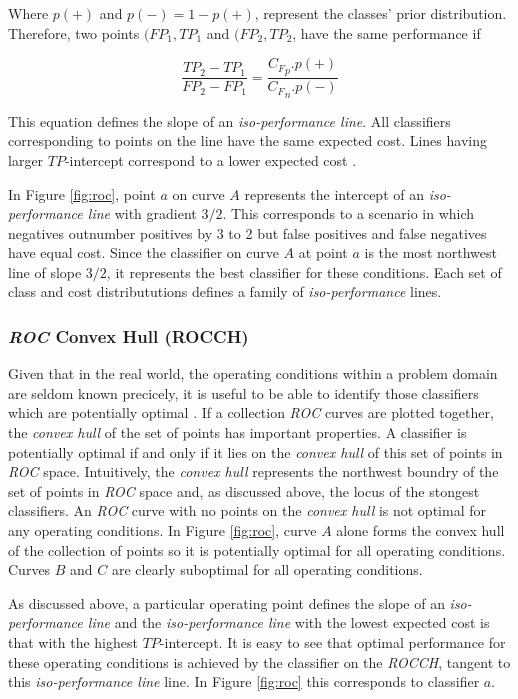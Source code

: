 \documentclass[10pt]{unbthesis}
\begin{document}
Where \(p(+)\) and \(p(-) = 1 - p(+)\), represent the classes' prior
distribution. Therefore, two points \((FP_1, TP_1\) and \((FP_2,
TP_2\), have the same performance if 

\begin{equation}
  \frac{TP_2 - TP_1}{FP_2 - FP_1} = \frac{{C_F}_p . p(+)}{{C_F}_n . p(-)}
\end{equation}

This equation defines the slope of an \textit{iso-performance
  line}. All classifiers corresponding to points on the line have the
same expected cost. Lines having larger \(TP\)-intercept correspond to
a lower expected cost \cite{RefWorks:61}.

In Figure \ref{fig:roc}, point \(a\) on curve \(A\) represents the
intercept of an \textit{iso-performance line} with gradient
\(3/2\). This corresponds to a scenario in which negatives outnumber
positives by 3 to 2 but false positives and false negatives have equal
cost. Since the classifier on curve \(A\) at point \(a\) is the most
northwest line of slope \(3/2\), it represents the best classifier for
these conditions. Each set of class and cost distribututions defines a
family of \textit{iso-performance} lines.


\subsubsection{\textit{ROC} Convex Hull (ROCCH)}
Given that in the real world, the operating conditions within a
problem domain are seldom known precicely, it is useful to be able to
identify those classifiers which are potentially optimal
\cite{RefWorks:61}. If a collection \textit{ROC} curves are plotted
together, the \textit{convex hull} of the set of points has important
properties. A classifier is potentially optimal if and only if it lies
on the \textit{convex hull} of this set of points in \textit{ROC}
space. Intuitively, the \textit{convex hull} represents the northwest
boundry of the set of points in \textit{ROC} space and, as discussed
above, the locus of the stongest classifiers. An \textit{ROC} curve
with no points on the \textit{convex hull} is not optimal for any
operating conditions. In Figure \ref{fig:roc}, curve \(A\) alone forms
the convex hull of the collection of points so it is potentially
optimal for all operating conditions. Curves \(B\) and \(C\) are
clearly suboptimal for all operating conditions.

As discussed above, a particular operating point defines the slope of
an \textit{iso-performance line} and the \textit{iso-performance line}
with the lowest expected cost is that with the highest
\(TP\)-intercept. It is easy to see that optimal performance for these
operating conditions is achieved by the classifier on the
\textit{ROCCH}, tangent to this \textit{iso-performance line} line. In
Figure \ref{fig:roc} this corresponds to classifier \(a\).
\end{document}
